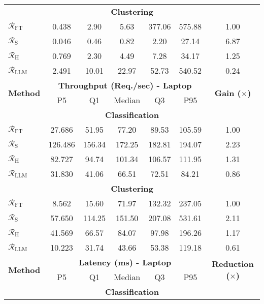 \begin{table}[t]
\begin{tabular}{lcccccc}
\multicolumn{7}{c}{\textbf{Clustering}} \\  %
$\mathcal{R}_\text{FT}$ & 0.438 & 2.90 & 5.63 & 377.06 & 575.88 & 1.00 \\ %
$\mathcal{R}_\text{S}$ & 0.046 & 0.46 & 0.82 & 2.20 & 27.14 & 6.87 \\ %
$\mathcal{R}_\text{H}$ & 0.769 & 2.30 & 4.49 & 7.28 & 34.17 & 1.25 \\ %
$\mathcal{R}_\text{LLM}$ & 2.491 & 10.01 & 22.97 & 52.73 & 540.52 & 0.24 \\ %
\midrule
\multirow{2}{*}{\textbf{Method}} 
& \multicolumn{5}{c}{\textbf{Throughput (Req./sec) - Laptop}} & \multirow{2}{*}{\textbf{Gain ($\times$)}} \\
\cmidrule(lr){2-6}
 & P5 & Q1 & Median & Q3 & P95 & \\
\midrule
\multicolumn{7}{c}{\textbf{Classification}} \\  %
$\mathcal{R}_\text{FT}$ & 27.686 & 51.95 & 77.20 & 89.53 & 105.59 & 1.00 \\ %
$\mathcal{R}_\text{S}$ & 126.486 & 156.34 & 172.25 & 182.81 & 194.07 & 2.23 \\ %
$\mathcal{R}_\text{H}$ & 82.727 & 94.74 & 101.34 & 106.57 & 111.95 & 1.31 \\ %
$\mathcal{R}_\text{LLM}$ & 31.830 & 41.06 & 66.51 & 72.51 & 84.21 & 0.86 \\ %
\multicolumn{7}{c}{\textbf{Clustering}} \\  %
$\mathcal{R}_\text{FT}$ & 8.562 & 15.60 & 71.97 & 132.32 & 237.05 & 1.00 \\ %
$\mathcal{R}_\text{S}$ & 57.650 & 114.25 & 151.50 & 207.08 & 531.61 & 2.11 \\ %
$\mathcal{R}_\text{H}$ & 41.569 & 66.57 & 84.07 & 97.98 & 196.26 & 1.17 \\ %
$\mathcal{R}_\text{LLM}$ & 10.223 & 31.74 & 43.66 & 53.38 & 119.18 & 0.61 \\ %
\midrule
\multirow{2}{*}{\textbf{Method}} 
& \multicolumn{5}{c}{\textbf{Latency (ms) - Laptop}} & \multirow{2}{*}{\textbf{Reduction ($\times$)}} \\
\cmidrule(lr){2-6}
& P5 & Q1 & Median & Q3 & P95 & \\
\midrule
\multicolumn{7}{c}{\textbf{Classification}} \\  %

\end{tabular}
\end{table}
